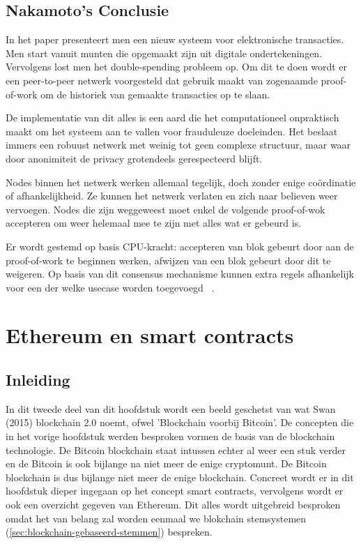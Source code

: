 	\subsection{Nakamoto’s Conclusie}
	In het paper presenteert men een nieuw systeem voor elektronische transacties. Men start vanuit munten die opgemaakt zijn uit digitale ondertekeningen. Vervolgens lost men het double-spending probleem op. Om dit te doen wordt er een peer-to-peer netwerk voorgesteld dat gebruik maakt van zogenaamde proof-of-work om de historiek van gemaakte transacties op te slaan. 
	
	De implementatie van dit alles is een aard die het computationeel onpraktisch maakt om het systeem aan te vallen voor frauduleuze doeleinden. Het beslaat immers een robuust netwerk met weinig tot geen complexe structuur, maar waar door anonimiteit de privacy grotendeels gerespecteerd blijft. 
	
	Nodes binnen het netwerk werken allemaal tegelijk, doch zonder enige coördinatie of afhankelijkheid. Ze kunnen het netwerk verlaten en zich naar believen weer vervoegen. Nodes die zijn weggeweest moet enkel de volgende proof-of-wok accepteren om weer helemaal mee te zijn met alles wat er gebeurd is. 
	
	Er wordt gestemd op basis CPU-kracht: accepteren van blok gebeurt door aan de proof-of-work te beginnen werken, afwijzen van een blok gebeurt door dit te weigeren. Op basis van dit consensus mechanisme kunnen extra regels afhankelijk voor een der welke usecase worden toegevoegd ~\autocite{Nakamoto2008}. 
	\newpage
\section{Ethereum en smart contracts}
\label{sec:ethereum-en-smart-contracts}
	\subsection*{Inleiding}
		In dit tweede deel van dit hoofdstuk wordt een beeld geschetst van wat Swan (2015) blockchain 2.0 noemt, ofwel 'Blockchain voorbij Bitcoin'. De concepten die in het vorige hoofdstuk werden besproken vormen de basis van de blockchain technologie. De Bitcoin blockchain staat intussen echter al weer een stuk verder en de Bitcoin is ook bijlange na niet meer de enige cryptomunt. De Bitcoin blockchain is dus bijlange niet meer de enige blockchain. Concreet wordt er in dit hoofdstuk dieper ingegaan op het concept  smart contracts, vervolgens wordt er ook een overzicht gegeven van Ethereum. Dit alles wordt uitgebreid besproken omdat het van belang zal worden eenmaal we blokchain stemsystemen (\ref{sec:blockchain-gebaseerd-stemmen}) bespreken.
